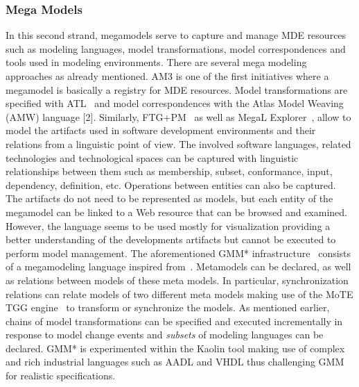 \subsubsection{Mega Models}
%
In this second strand, megamodels serve to capture and manage
MDE resources such as modeling languages, model transformations, model correspondences and tools used in modeling environments.
There are several mega modeling approaches as already mentioned. AM3 \cite{am3-website} is one of the first initiatives where a megamodel is basically a registry for MDE resources. Model transformations are specified with ATL~\cite{atl-website} and model correspondences with the Atlas Model Weaving (AMW) language [2]. 
Similarly, FTG+PM~\cite{Lucio_et_al:2013} as well as MegaL Explorer~\cite{Favre:2012:MLA:2404962.2404978}, allow to model the artifacts used in software development environments and their relations from a linguistic point of view. 
The involved software languages, related technologies and technological spaces can be captured with linguistic relationships between them such as membership, subset, conformance, input, dependency, definition, etc. Operations between entities can also be captured. The artifacts do not need to be represented as models, but each entity of the megamodel can be linked to a Web resource that can be browsed and examined.
However, the language seems to be used mostly for visualization providing a better understanding of the developments artifacts but cannot be executed to perform model management.
The aforementioned GMM* infrastructure~\cite{BlouinGemoc2014} consists of a megamodeling language inspired from~\cite{HSG2010}. Metamodels can be declared, as well as relations between models of these meta models. In particular, synchronization relations can relate models of two different meta models making use of the MoTE TGG engine~\cite{mote-website} to transform or synchronize the models. As mentioned earlier, chains of model transformations can be specified and executed incrementally in response to model change events and \emph{subsets} of modeling languages can be declared. GMM* is experimented within the Kaolin tool \cite{BlouinAHS2015} making use of complex and rich industrial languages such as AADL and VHDL thus challenging GMM for realistic specifications.



